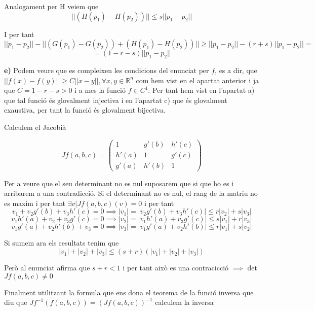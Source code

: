 \documentclass[12pt, a4papre]{article}
\begin{document}
	Analogament per H veiem que
	\[
	||(H(p_1)-H(p_2))||\leq s||p_1-p_2||
	\]
	
	I per tant 
	\[
	||p_1-p_2||-||(G(p_1)-G(p_2))+(H(p_1)-H(p_2))|| \geq ||p_1-p_2||-(r+s)||p_1-p_2||=
	\]
	\[
	=(1-r-s)||p_1-p_2||
	\]
	
	\textbf{e)} Podem veure que es compleixen les condicions del enunciat per $f$, es a dir, que $||f(x)-f(y)||\geq C||x-y||,\forall x,y\in\mathbb{R}^n$ com hem 
	vist en el apartat anterior i ja que $C=1-r-s>0$ i a mes la funció $f\in C^1$. Per tant hem vist en l'apartat a) que tal funció és glovalment injectiva i en l'apartat c) que 
	és glovalment exaustiva, per tant la funció és glovalment bijectiva.
	
	Calculem el Jacobià 
	
	\[
	Jf(a,b,c)=
	\begin{pmatrix}
		1		&g'(b)	&h'(c)\\
		h'(a)		&1		&g'(c)\\
		g'(a)		&h'(b)	&1
	\end{pmatrix}
	\]
	
	Per a veure que el seu determinant no es nul suposarem que si que ho es i arribarem a una contradicció. Si el determinant no es nul, el rang de la matriu no es maxim
	i per tant $\exists v | Jf(a,b,c)(v)=0$ i per tant
	\[
	v_1+v_2g'(b)+v_3h'(c)=0 \implies |v_1|=|v_2g'(b)+v_3h'(c)|\leq r|v_2|+s|v_3|
	\]
	\[
	v_1h'(a)+v_2+v_3g'(c)=0 \implies |v_2|=|v_1h'(a)+v_3g'(c)|\leq s|v_1|+r|v_3|
	\]
	\[
	v_1g'(a)+v_2h'(b)+v_3=0 \implies |v_3|=|v_1g'(a)+v_2h'(b)|\leq r|v_1|+s|v_2|
	\]

	Si sumem ara els resultats tenim que 
	\[
	|v_1|+|v_2|+|v_3|\leq(s+r)(|v_1|+|v_2|+|v_3|)
	\]
	
	Però al enunciat afirma que $s+r<1$ i per tant això es una contracicció $\implies$ det$Jf(a,b,c)\ne 0$
	
	Finalment utilitzant la formula que ens dona el teorema de la funció inversa que diu que $Jf^{-1}(f(a,b,c))=(Jf(a,b,c))^{-1}$ calculem la inversa
	
\end{document}
